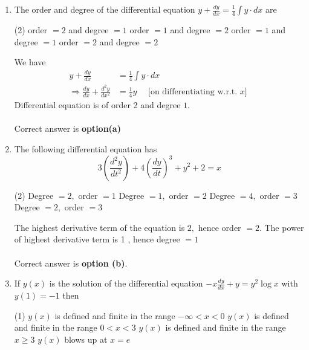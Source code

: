 \begin{enumerate}[label=\color{ocre}\textbf{\arabic*.}]
\item The order and degree of the differential equation $y+\frac{d y}{d x}=\frac{1}{4} \int y \cdot d x$ are

\begin{tasks}(2)
		\task[\textbf{a.}]order $=2$ and degree $=1$ 
		\task[\textbf{b.}]order $=1$ and degree $=2$
		\task[\textbf{c.}]order $=1$ and degree $=1$ 
		\task[\textbf{d.}]order $=2$ and degree $=2$ 
\end{tasks}
\begin{answer}
	We have
	\begin{align*}
	y+\frac{d y}{d x}&=\frac{1}{4} \int y \cdot d x \\
	\Rightarrow \frac{d y}{d x}+\frac{d^{2} y}{d x^{2}}&=\frac{1}{4} y \quad \text { [on  differentiating w.r.t. $x$] }
	\end{align*}
	Differential equation is of order 2 and degree $1 .$\\\\
	Correct answer is \textbf{option(a)}
\end{answer}
\item The following differential equation has
$$
3\left(\frac{d^{2} y}{d t^{2}}\right)+4\left(\frac{d y}{d t}\right)^{3}+y^{2}+2=x
$$
\begin{tasks}(2)
	\task[\textbf{a.}]Degree $=2,$ order $=1$  
	\task[\textbf{b.}]Degree $=1,$ order $=2$
	\task[\textbf{c.}]Degree $=4,$ order $=3$ 
	\task[\textbf{d.}]Degree $=2,$ order $=3$ 
\end{tasks}
\begin{answer}
	The highest derivative term of the equation is $2,$ hence order $=2$. The power of highest derivative term is 1 , hence degree $=1$
\\\\	Correct answer is \textbf{option (b)}.
\end{answer}
	\item  If $y(x)$ is the solution of the differential equation $-x \frac{d y}{d x}+y=y^{2} \log x$ with $y(1)=-1$
then\begin{tasks}(1)
	\task[\textbf{a.}] $y(x)$ is defined and finite in the range $-\infty<x<0$ 
	\task[\textbf{b.}]$y(x)$ is defined and finite in the range $0<x<3$
	\task[\textbf{c.}] $y(x)$ is defined and finite in the range $x \geq 3$
	\task[\textbf{d.}]  $y(x)$ blows up at $x=e$
\end{tasks}
\begin{answer}

\end{answer}
\end{enumerate}
